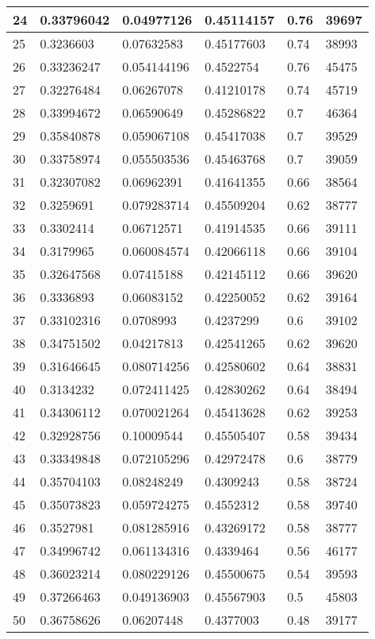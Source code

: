 \begin{longtable}{|l|l|l|l|l|l|}
24 & 0.33796042 & 0.04977126 & 0.45114157 & 0.76 & 39697 \\ \hline 
25 & 0.3236603 & 0.07632583 & 0.45177603 & 0.74 & 38993 \\ \hline 
26 & 0.33236247 & 0.054144196 & 0.4522754 & 0.76 & 45475 \\ \hline 
27 & 0.32276484 & 0.06267078 & 0.41210178 & 0.74 & 45719 \\ \hline 
28 & 0.33994672 & 0.06590649 & 0.45286822 & 0.7 & 46364 \\ \hline 
29 & 0.35840878 & 0.059067108 & 0.45417038 & 0.7 & 39529 \\ \hline 
30 & 0.33758974 & 0.055503536 & 0.45463768 & 0.7 & 39059 \\ \hline 
31 & 0.32307082 & 0.06962391 & 0.41641355 & 0.66 & 38564 \\ \hline 
32 & 0.3259691 & 0.079283714 & 0.45509204 & 0.62 & 38777 \\ \hline 
33 & 0.3302414 & 0.06712571 & 0.41914535 & 0.66 & 39111 \\ \hline 
34 & 0.3179965 & 0.060084574 & 0.42066118 & 0.66 & 39104 \\ \hline 
35 & 0.32647568 & 0.07415188 & 0.42145112 & 0.66 & 39620 \\ \hline 
36 & 0.3336893 & 0.06083152 & 0.42250052 & 0.62 & 39164 \\ \hline 
37 & 0.33102316 & 0.0708993 & 0.4237299 & 0.6 & 39102 \\ \hline 
38 & 0.34751502 & 0.04217813 & 0.42541265 & 0.62 & 39620 \\ \hline 
39 & 0.31646645 & 0.080714256 & 0.42580602 & 0.64 & 38831 \\ \hline 
40 & 0.3134232 & 0.072411425 & 0.42830262 & 0.64 & 38494 \\ \hline 
41 & 0.34306112 & 0.070021264 & 0.45413628 & 0.62 & 39253 \\ \hline 
42 & 0.32928756 & 0.10009544 & 0.45505407 & 0.58 & 39434 \\ \hline 
43 & 0.33349848 & 0.072105296 & 0.42972478 & 0.6 & 38779 \\ \hline 
44 & 0.35704103 & 0.08248249 & 0.4309243 & 0.58 & 38724 \\ \hline 
45 & 0.35073823 & 0.059724275 & 0.4552312 & 0.58 & 39740 \\ \hline 
46 & 0.3527981 & 0.081285916 & 0.43269172 & 0.58 & 38777 \\ \hline 
47 & 0.34996742 & 0.061134316 & 0.4339464 & 0.56 & 46177 \\ \hline 
48 & 0.36023214 & 0.080229126 & 0.45500675 & 0.54 & 39593 \\ \hline 
49 & 0.37266463 & 0.049136903 & 0.45567903 & 0.5 & 45803 \\ \hline 
50 & 0.36758626 & 0.06207448 & 0.4377003 & 0.48 & 39177 \\ \hline 
\end{longtable}